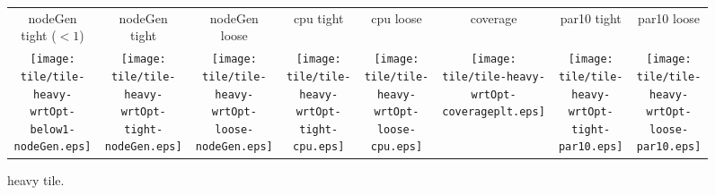 \documentclass[a4paper,landscape]{article}
\begin{document}
\begin{figure}[t]
	\centering
	\begin{tabular}{c c c c c c c c}
        nodeGen tight ($<1$) & nodeGen tight & nodeGen loose & cpu
        tight & cpu loose & coverage & par10 tight & par10 loose\\
	   \begin{minipage}{\cpufigureplotwidth}
      \texttt{[image: tile/tile-heavy-wrtOpt-below1-nodeGen.eps]}
        \end{minipage}&
        \begin{minipage}{\cpufigureplotwidth}
        \texttt{[image: tile/tile-heavy-wrtOpt-tight-nodeGen.eps]}
        \end{minipage}&
        \begin{minipage}{\cpufigureplotwidth}
      \texttt{[image: tile/tile-heavy-wrtOpt-loose-nodeGen.eps]}
        \end{minipage}&
        \begin{minipage}{\cpufigureplotwidth}
        \texttt{[image: tile/tile-heavy-wrtOpt-tight-cpu.eps]}
        \end{minipage}&
        \begin{minipage}{\cpufigureplotwidth}
        \texttt{[image: tile/tile-heavy-wrtOpt-loose-cpu.eps]}
        \end{minipage}&
        \begin{minipage}{\cpufigureplotwidth}
        \texttt{[image: tile/tile-heavy-wrtOpt-coverageplt.eps]}
        \end{minipage}&
        \begin{minipage}{\cpufigureplotwidth}
        \texttt{[image: tile/tile-heavy-wrtOpt-tight-par10.eps]}
        \end{minipage}&
        \begin{minipage}{\cpufigureplotwidth}
        \texttt{[image: tile/tile-heavy-wrtOpt-loose-par10.eps]}
        \end{minipage}
	\end{tabular}
	\caption{heavy tile.}
    \label{fig:tile-heavy}
\end{figure}
\end{document}
